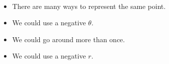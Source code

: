 \begin{frame}
\begin{columns}[c]
\ %

\ %
\ %

\ %
\end{columns}
\begin{itemize}
\item  There are many ways to represent the same point.
\item<2-| alert@2>  We could use a negative $\theta$.
\item<3-| alert@3>  We could go around more than once.
\item<4-| alert@4>  We could use a negative $r$.
\end{itemize}
\end{frame}

